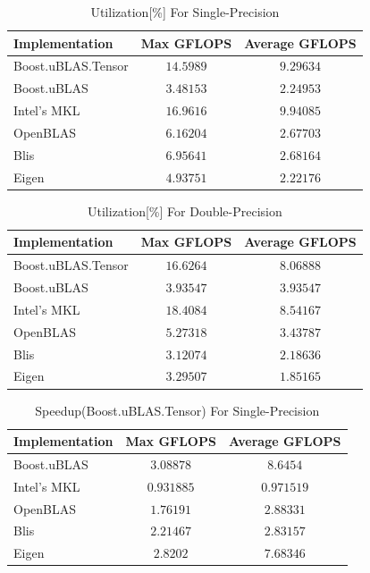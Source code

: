 \begin{table}[ht]
    \centering
    \caption{Utilization[\%] For Single-Precision}
    \begin{tabular}{|l|c|c|}
        \hline
        \textbf{Implementation} & \textbf{Max GFLOPS} & \textbf{Average GFLOPS}\\
        \hline
        Boost.uBLAS.Tensor  & $14.5989$ & $9.29634$ \\
        \hline
        Boost.uBLAS         & $3.48153$ & $2.24953$ \\
        \hline
        Intel's MKL         & $16.9616$ & $9.94085$ \\
        \hline
        OpenBLAS            & $6.16204$ & $2.67703$ \\
        \hline
        Blis                & $6.95641$ & $2.68164$ \\
        \hline
        Eigen               & $4.93751$ & $2.22176$ \\
        \hline
    \end{tabular}
\end{table}

\begin{table}[ht]
    \centering
    \caption{Utilization[\%] For Double-Precision}
    \begin{tabular}{|l|c|c|}
        \hline
        \textbf{Implementation} & \textbf{Max GFLOPS} & \textbf{Average GFLOPS}\\
        \hline
        Boost.uBLAS.Tensor  & $16.6264$ & $8.06888$ \\
        \hline
        Boost.uBLAS         & $3.93547$ & $3.93547$ \\
        \hline
        Intel's MKL         & $18.4084$ & $8.54167$ \\
        \hline
        OpenBLAS            & $5.27318$ & $3.43787$ \\
        \hline
        Blis                & $3.12074$ & $2.18636$ \\
        \hline
        Eigen               & $3.29507$ & $1.85165$ \\
        \hline
    \end{tabular}
\end{table}

\begin{table}[ht]
    \centering
    \caption{Speedup(Boost.uBLAS.Tensor) For Single-Precision}
    \begin{tabular}{|l|c|c|}
        \hline
        \textbf{Implementation} & \textbf{Max GFLOPS} & \textbf{Average GFLOPS}\\
        \hline
        Boost.uBLAS         & $3.08878$ & $8.6454$ \\
        \hline
        Intel's MKL         & $0.931885$ & $0.971519$ \\
        \hline
        OpenBLAS            & $1.76191$ & $2.88331$ \\
        \hline
        Blis                & $2.21467$ & $2.83157$ \\
        \hline
        Eigen               & $2.8202$ & $7.68346$ \\
        \hline
    \end{tabular}
\end{table}

